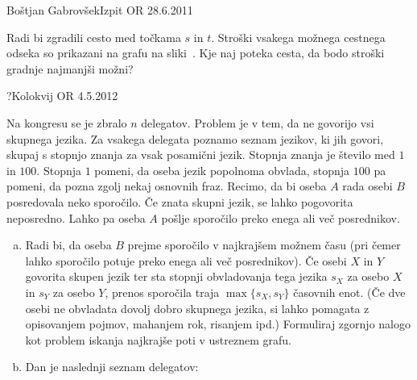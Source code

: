 \begin{naloga}{Boštjan Gabrovšek}{Izpit OR 28.6.2011}
\begin{vprasanje}[cesta]
Radi bi zgradili cesto med točkama $s$ in $t$.
Stroški vsakega možnega cestnega odseka
so prikazani na grafu na sliki~\fig{}.
Kje naj poteka cesta, da bodo stroški gradnje najmanjši možni?

\begin{slika}
\pgfslika
{}
\end{slika}
\end{vprasanje}
\begin{odgovor}
\end{odgovor}
\end{naloga}


\begin{naloga}{?}{Kolokvij OR 4.5.2012}
\begin{vprasanje}[delegati]
Na kongresu se je zbralo $n$ delegatov.
Problem je v tem, da ne govorijo vsi skup\-ne\-ga jezika.
Za vsakega delegata poznamo seznam jezikov, ki jih govori,
skupaj s stopnjo znanja za vsak posamični jezik.
Stopnja znanja je število med $1$ in $100$.
Stopnja $1$ pomeni, da oseba jezik popolnoma obvlada,
stopnja $100$ pa pomeni, da pozna zgolj nekaj osnovnih fraz.
Recimo, da bi oseba $A$ rada osebi $B$ posredovala neko sporočilo.
Če znata skupni jezik, se lahko pogovorita neposredno.
Lahko pa oseba $A$ pošlje sporočilo preko enega ali več posrednikov.

\begin{enumerate}[(a)]
\item Radi bi, da oseba $B$ prejme sporočilo v najkrajšem možnem času
(pri čemer lahko sporočilo potuje preko enega ali več posrednikov).
Če osebi $X$ in $Y$ govorita skupen jezik
ter sta stopnji obvladovanja tega jezika
$s_X$ za osebo $X$ in $s_Y$ za osebo $Y$,
prenos sporočila traja $\max\{s_X, s_Y\}$ časovnih enot.
(Če dve osebi ne obvladata dovolj dobro skupnega jezika,
si lahko pomagata z opisovanjem pojmov, mahanjem rok, risanjem ipd.)
Formuliraj zgornjo nalogo
kot problem iskanja najkrajše poti v ustreznem grafu.

\item Dan je naslednji seznam delegatov:


\end{enumerate}
\end{vprasanje}
\end{naloga}
